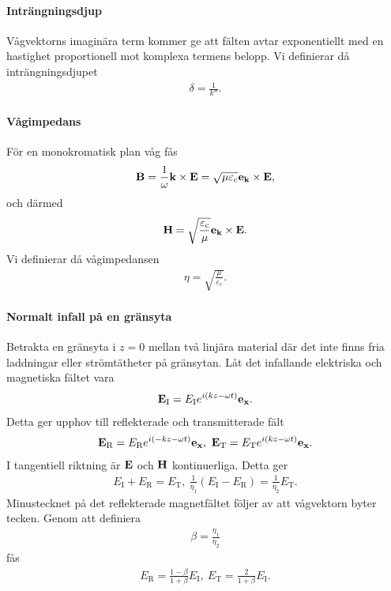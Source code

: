 \paragraph{Inträngningsdjup}
Vågvektorns imaginära term kommer ge att fälten avtar exponentiellt med en hastighet proportionell mot komplexa termens belopp. Vi definierar då inträngningsdjupet
\begin{align*}
	\delta = \frac{1}{k''}.
\end{align*}

\paragraph{Vågimpedans}
För en monokromatisk plan våg fås
\begin{align*}
	\vb{B} = \frac{1}{\omega}\vb{k}\times\vb{E} = \sqrt{\mu\varepsilon_{\text{c}}}\vb{e}_{\vb{k}}\times\vb{E},
\end{align*}
och därmed
\begin{align*}
	\vb{H} = \sqrt{\frac{\varepsilon_{\text{c}}}{\mu}}\vb{e}_{\vb{k}}\times\vb{E}.
\end{align*}
Vi definierar då vågimpedansen
\begin{align*}
	\eta = \sqrt{\frac{\mu}{\varepsilon_{\text{c}}}}.
\end{align*}

\paragraph{Normalt infall på en gränsyta}
Betrakta en gränsyta i $z = 0$ mellan två linjära material där det inte finns fria laddningar eller strömtätheter på gränsytan. Låt det infallande elektriska och magnetiska fältet vara
\begin{align*}
	\vb{E}_{\text{I}} = E_{\text{I}}e^{i(kz - \omega t)}\vb{e}_{\vb{x}}.
\end{align*}
Detta ger upphov till reflekterade och transmitterade fält
\begin{align*}
	\vb{E}_{\text{R}} = E_{\text{R}}e^{i(-kz - \omega t)}\ub{x},\ \vb{E}_{\text{T}} = E_{\text{T}}e^{i(kz - \omega t)}\ub{x}.
\end{align*}
I tangentiell riktning är $\vb{E}$ och $\vb{H}$ kontinuerliga. Detta ger
\begin{align*}
	E_{\text{I}} + E_{\text{R}} = E_{\text{T}},\ \frac{1}{\eta_{1}}(E_{\text{I}} - E_{\text{R}}) = \frac{1}{\eta_{2}}E_{\text{T}}.
\end{align*}
Minustecknet på det reflekterade magnetfältet följer av att vågvektorn byter tecken. Genom att definiera
\begin{align*}
	\beta = \frac{\eta_{1}}{\eta_{2}}
\end{align*}
fås
\begin{align*}
	E_{\text{R}} = \frac{1 - \beta}{1 + \beta}E_{\text{I}},\ E_{\text{T}} = \frac{2}{1 + \beta}E_{\text{I}}.
\end{align*}

